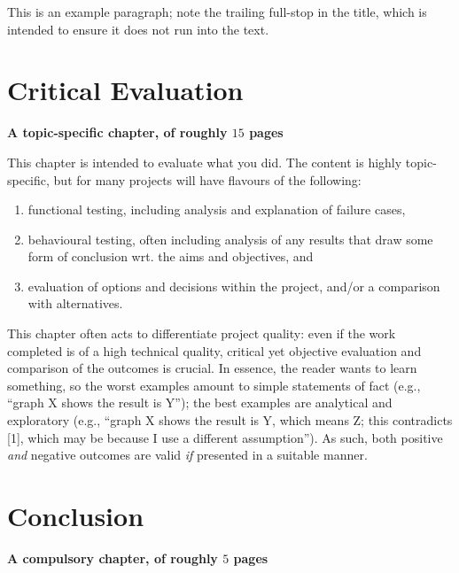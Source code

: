 \documentclass[ %
                    author={Manan Vaswani},
                supervisor={Dr. Raphael Clifford},
                    degree={MEng},
                     title={A multi-core CPU implementation \n of the classical Boson Sampling algorithm},
                  subtitle={},
                      type={},
                      year={2019} ]{dissertation}
\begin{document}
This is an example paragraph; note the trailing full-stop in the title,
which is intended to ensure it does not run into the text.


\chapter{Critical Evaluation}
\label{chap:evaluation}

{\bf A topic-specific chapter, of roughly $15$ pages} 
\vspace{1cm} 

\noindent
This chapter is intended to evaluate what you did.  The content is highly 
topic-specific, but for many projects will have flavours of the following:

\begin{enumerate}
\item functional  testing, including analysis and explanation of failure 
      cases,
\item behavioural testing, often including analysis of any results that 
      draw some form of conclusion wrt. the aims and objectives,
      and
\item evaluation of options and decisions within the project, and/or a
      comparison with alternatives.
\end{enumerate}

\noindent
This chapter often acts to differentiate project quality: even if the work
completed is of a high technical quality, critical yet objective evaluation 
and comparison of the outcomes is crucial.  In essence, the reader wants to
learn something, so the worst examples amount to simple statements of fact 
(e.g., ``graph X shows the result is Y''); the best examples are analytical 
and exploratory (e.g., ``graph X shows the result is Y, which means Z; this 
contradicts [1], which may be because I use a different assumption'').  As 
such, both positive {\em and} negative outcomes are valid {\em if} presented 
in a suitable manner.


\chapter{Conclusion}
\label{chap:conclusion}

{\bf A compulsory chapter,     of roughly $5$ pages} 
\vspace{1cm} 
\end{document}

